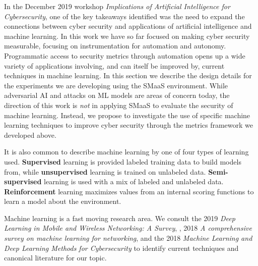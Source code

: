 In the December 2019 workshop\textit{ Implications of Artificial Intelligence for Cybersecurity}\cite{Evans_2008}, one of the key takeaways identified was the need to expand the connections between cyber security and applications of artificial intelligence and machine learning. In this work we have so far focused on making cyber security measurable, focusing on instrumentation for automation and autonomy. Programmatic access to security metrics through automation opens up a wide variety of applications involving, and can itself be improved by, current techniques in machine learning. In this section we describe the design details for the experiments we are developing using the SMaaS environment. While adversarial AI and attacks on ML models are areas of concern today, the direction of this work is \textit{not} in applying SMaaS to evaluate the security of machine learning. Instead, we propose to investigate the use of specific machine learning techniques to improve cyber security through the metrics framework we developed above. 


It is also common to describe machine learning by one of four types of learning used. \textbf{Supervised} learning is provided labeled training data to build models from, while \textbf{unsupervised} learning is trained on unlabeled data. \textbf{Semi-supervised} learning is used with a mix of labeled and unlabeled data. \textbf{Reinforcement} learning\cite{Sutton_Barto_2018} maximizes values from an internal scoring functions to learn a model about the environment. 

Machine learning is a fast moving research area. We consult the 2019 \textit{Deep Learning in Mobile and Wireless Networking: A Survey}, \cite{Zhang_Patras_Haddadi_2019}, 2018 \textit{A comprehensive survey on machine
learning for networking}\cite{Boutaba_2018}, and the 2018 \textit{Machine Learning and Deep Learning Methods for Cybersecurity}\cite{Xin_Kong_Liu_Chen_Li_Zhu_Gao_Hou_Wang_2018} to identify current techniques and canonical literature for our topic. 

